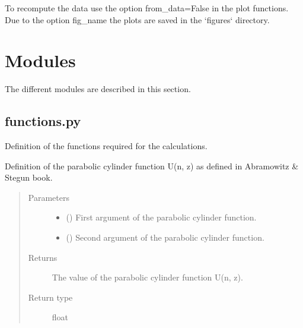 \documentclass[letterpaper,10pt,english]{sphinxmanual}
\begin{document}
\sphinxAtStartPar
To re\sphinxhyphen{}compute the data use the option from\_data=False in the plot functions.
Due to the option fig\_name the plots are saved in the ‘figures‘ directory.

\sphinxstepscope


\chapter{Modules}
\label{\detokenize{modules:modules}}\label{\detokenize{modules::doc}}
\sphinxAtStartPar
The different modules are described in this section.


\section{functions.py}
\label{\detokenize{modules:module-modules.functions}}\label{\detokenize{modules:functions-py}}
\sphinxAtStartPar
Definition of the functions required for the calculations.

\begin{fulllineitems}
\label{\detokenize{modules:modules.functions.U}}
\pysigstartsignatures
{}
\pysigstopsignatures
\sphinxAtStartPar
Definition of the parabolic cylinder function U(n, z) as defined in Abramowitz \& Stegun book.
\begin{quote}\begin{description}
\item[{Parameters}] \leavevmode\begin{itemize}
\item {} 
\sphinxAtStartPar
{} () \textendash{} First argument of the parabolic cylinder function.

\item {} 
\sphinxAtStartPar
{} () \textendash{} Second argument of the parabolic cylinder function.

\end{itemize}

\item[{Returns}] \leavevmode
\sphinxAtStartPar
The value of the parabolic cylinder function U(n, z).

\item[{Return type}] \leavevmode
\sphinxAtStartPar
float

\end{description}\end{quote}

\end{fulllineitems}
\end{document}
